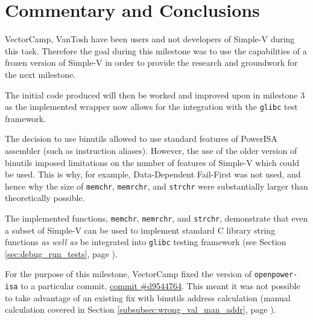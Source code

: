 \chapter{Commentary and Conclusions}

VectorCamp, VanTosh have been users and not developers
of Simple-V during this task.
Therefore the goal during this milestone was to use the capabilities of a
frozen version of Simple-V in order to provide the research and
groundwork for the next milestone.

The initial code produced will then be worked and improved upon in milestone 3
as the implemented wrapper now allows for the integration with the
\texttt{glibc} test framework.

The decision to use binutils allowed to use standard features of
PowerISA assembler (such as instruction aliases).
However, the use of the older version of binutils imposed limitations
on the number of features of
Simple-V which could be used. This is why, for example,
Data-Dependent Fail-First was not used, and hence why the size of
\texttt{memchr}, \texttt{memrchr}, and \texttt{strchr} were
substantially larger than theoretically possible.

The implemented functions, \texttt{memchr}, \texttt{memrchr},
and \texttt{strchr}, demonstrate that even a subset of Simple-V can be used
to implement standard C library string functions \textit{as well as} be
integrated into \texttt{glibc} testing framework
(see Section \ref{sec:debug_run_tests}, page \pageref{sec:debug_run_tests}).

For the purpose of this milestone, VectorCamp fixed the version of
\texttt{openpower-isa} to a particular commit,
\href{https://git.libre-soc.org/?p=openpower-isa.git;a=commitdiff;h=d9544764b1710f3807a9c0685d150a665f70b9a2}{commit \#d9544764}.
This meant it was not possible to take advantage of an existing fix
with binutils address calculation (manual calculation covered in Section
\ref{subsubsec:wrong_val_man_addr},
page \pageref{subsubsec:wrong_val_man_addr}).
